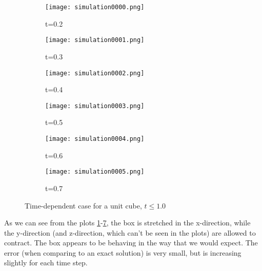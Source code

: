 \documentclass[twoside]{article}
\begin{document}
\begin{figure}[h!]
        \centering
        \begin{subfigure}[b]{0.3\textwidth}
                \centering
                \texttt{[image: simulation0000.png]}
                \caption{t=0.2}
                \label{t:0.2}
        \end{subfigure}
        \quad
        \begin{subfigure}[b]{0.3\textwidth}
                \centering
                \texttt{[image: simulation0001.png]}
                \caption{t=0.3}
                \label{t:0.3}
        \end{subfigure}    
        \quad
        \begin{subfigure}[b]{0.3\textwidth}
                \centering
                \texttt{[image: simulation0002.png]}
                \caption{t=0.4}
                \label{t:0.4}
        \end{subfigure}  
        
        \begin{subfigure}[b]{0.3\textwidth}
                \centering
                \texttt{[image: simulation0003.png]}
                \caption{t=0.5}
                \label{t:0.5}
        \end{subfigure}        
        \quad
        \begin{subfigure}[b]{0.3\textwidth}
                \centering
                \texttt{[image: simulation0004.png]}
                \caption{t=0.6}
                \label{t:0.6}
        \end{subfigure}  
        \quad
        \begin{subfigure}[b]{0.3\textwidth}
                \centering
                \texttt{[image: simulation0005.png]}
                \caption{t=0.7}
                \label{t:0.7}
        \end{subfigure}   
        \caption{Time-dependent case for a unit cube, $t \leq 1.0$}     
\end{figure}

As we can see from the plots \ref{t:0.2}-\ref{t:0.7}, the box is stretched in the x-direction, while the y-direction (and z-direction, which can't be seen in the plots) are allowed to contract. The box appears to be behaving in the way that we would expect. The error (when comparing to an exact solution) is very small, but is increasing slightly for each time step. 
\end{document}
